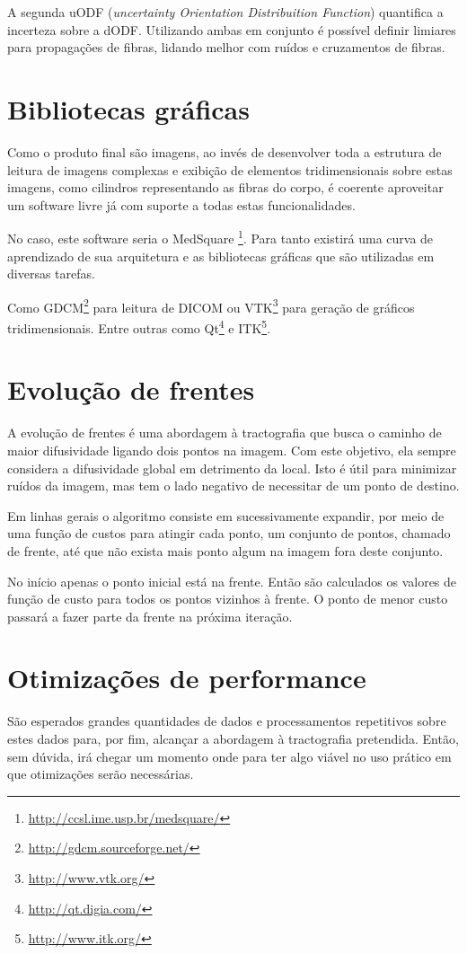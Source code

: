 \documentclass[a4paper,11pt]{report}
\begin{document}
  A segunda uODF (\textit{uncertainty Orientation Distribuition Function}) quantifica a incerteza sobre a dODF. Utilizando ambas em conjunto é possível definir limiares para propagações de fibras, lidando melhor com ruídos e cruzamentos de fibras.
  
  \section{Bibliotecas gráficas}
  Como o produto final são imagens, ao invés de desenvolver toda a estrutura de leitura de imagens complexas e exibição de elementos tridimensionais sobre estas imagens, como cilindros representando as fibras do corpo, é coerente aproveitar um software livre já com suporte a todas estas funcionalidades.
  
  No caso, este software seria o MedSquare \footnote{\url{http://ccsl.ime.usp.br/medsquare/}}. Para tanto existirá uma curva de aprendizado de sua arquitetura e as bibliotecas gráficas que são utilizadas em diversas tarefas.
  
  Como GDCM\footnote{\url{http://gdcm.sourceforge.net/}} para leitura de DICOM ou VTK\footnote{\url{http://www.vtk.org/}} para geração de gráficos tridimensionais. Entre outras como Qt\footnote{\url{http://qt.digia.com/}} e ITK\footnote{\url{http://www.itk.org/}}.
  
  \section{Evolução de frentes}
  A evolução de frentes é uma abordagem à tractografia que busca o caminho de maior difusividade ligando dois pontos na imagem. Com este objetivo, ela sempre considera a difusividade global em detrimento da local. Isto é útil para minimizar ruídos da imagem, mas tem o lado negativo de necessitar de um ponto de destino.
  
  Em linhas gerais o algoritmo consiste em sucessivamente expandir, por meio de uma função de custos para atingir cada ponto, um conjunto de pontos, chamado de frente, até que não exista mais ponto algum na imagem fora deste conjunto.
  
  No início apenas o ponto inicial está na frente. Então são calculados os valores de função de custo para todos os pontos vizinhos à frente. O ponto de menor custo passará a fazer parte da frente na próxima iteração.
  
  \section{Otimizações de performance}
  São esperados grandes quantidades de dados e processamentos repetitivos sobre estes dados para, por fim, alcançar a abordagem à tractografia pretendida. Então, sem dúvida, irá chegar um momento onde para ter algo viável no uso prático em que otimizações serão necessárias.
  
\end{document}
